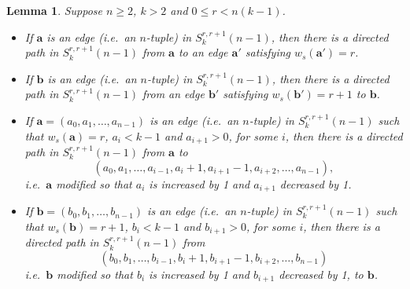 \documentclass[a4paper,11pt]{article}
\theoremstyle{plain}
\newtheorem{lemma}{Lemma}[section]
\theoremstyle{definition}
\theoremstyle{remark}
\begin{document}
\begin{lemma}  \label{lemma:S_prelims}
Suppose $n\geq2$, $k>2$ and $0\leq r<n(k-1)$.
\begin{itemize}
\item[(i)] If $\mathbf{a}$ is an edge (i.e.\ an $n$-tuple) in $S_k^{r,r+1}(n-1)$, then there is
    a directed path in $S_k^{r,r+1}(n-1)$ from $\mathbf{a}$ to an edge $\mathbf{a}'$ satisfying
    $w_s(\mathbf{a}')=r$.
\item[(ii)] If $\mathbf{b}$ is an edge (i.e.\ an $n$-tuple) in $S_k^{r,r+1}(n-1)$, then there
    is a directed path in $S_k^{r,r+1}(n-1)$ from an edge $\mathbf{b}'$ satisfying
    $w_s(\mathbf{b}')=r+1$ to $\mathbf{b}$.
\item[(iii)] If $\mathbf{a}=(a_0,a_1,\dots,a_{n-1})$ is an edge (i.e.\ an $n$-tuple) in
    $S_k^{r,r+1}(n-1)$ such that $w_s(\mathbf{a})=r$, $a_i<k-1$ and $a_{i+1}>0$, for some $i$,
    then there is a directed path in $S_k^{r,r+1}(n-1)$ from $\mathbf{a}$ to
\[ (a_0,a_1,\dots,a_{i-1},a_i+1, a_{i+1}-1,a_{i+2},\dots,a_{n-1}), \]
i.e.\ $\mathbf{a}$ modified so that $a_i$ is increased by 1 and $a_{i+1}$ decreased by 1.
\item[(iv)] If $\mathbf{b}=(b_0,b_1,\dots,b_{n-1})$ is an edge (i.e.\ an $n$-tuple) in
    $S_k^{r,r+1}(n-1)$ such that $w_s(\mathbf{b})=r+1$, $b_i<k-1$ and $b_{i+1}>0$, for some
    $i$, then there is a directed path in $S_k^{r,r+1}(n-1)$ from
\[ (b_0,b_1,\dots,b_{i-1},b_i+1,b_{i+1}-1,b_{i+2},\dots,b_{n-1}) \]
i.e.\ $\mathbf{b}$ modified so that $b_i$ is increased by 1 and $b_{i+1}$ decreased by 1, to
$\mathbf{b}$.
\end{itemize}
\end{lemma}
\end{document}
